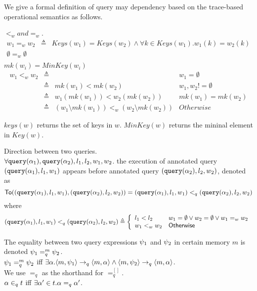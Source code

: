 \documentclass[a4paper,11pt]{article}
\begin{document}
{
   We give a formal definition of query may dependency based on the trace-based operational semantics as follows.
   }
%
\begin{defn}
$<_w and =_w$.\\
\[
  \begin{array}{lll}
     w_1 =_w w_2  &  \triangleq &  Keys(w_1) = Keys(w_2) \land \forall k \in Keys(w_1). w_1(k) = w_2(k) \\
     \emptyset =_w \emptyset & &   \\
  \end{array}
\] 
$mk(w_i) =MinKey(w_i) $ 
\[
\begin{array}{lllr}
     w_1 <_w w_2 & \triangleq & & w_1 = \emptyset \\
     & \triangleq  & mk(w_1) < mk(w_2) & w_1,w_2 != \emptyset  \\
     & \triangleq & w_1(mk(w_1)) < w_2(mk(w_2))   & mk(w_1) = mk(w_2) \\
     & \triangleq & (w_1 \setminus mk(w_1) ) <_w (w_2 \setminus mk(w_2)) & Otherwise
\end{array}
\]
\end{defn}
$keys(w)$ returns the set of keys in $w$. $MinKey(w)$ returns the mininal element in $Key(w)$.
%
\begin{defn}
\label{def:query_dir}
Direction between two queries.
\\
{
$\forall {\tt query}(\alpha_1), {\tt query}(\alpha_2), l_1, l_2, w_1, w_2 $.
the execution of annotated query $( {\tt query}(\alpha_1), l_1, w_1)$ appears before annotated query $( {\tt query}(\alpha_2), l_2, w_2)$, denoted as
%
\[
\mathsf{To}(({\tt query}(\alpha_1), l_1, w_1), ( {\tt query}(\alpha_2), l_2, w_2))
= 
({\tt query}(\alpha_1), l_1, w_1) 
<_q ( {\tt query}(\alpha_2), l_2, w_2)
\]
where \\
\[
(\query(\qval_1), l_1, w_1) 
<_q ( \query(\qval_2), l_2, w_2)
 \triangleq 
 \left\{
 \begin{array}{ll}
    l_1 < l_2  
    & w_1=\emptyset \lor w_2 = \emptyset \lor w_1 =_w w_2
    \\
    w_1 <_w w_2
    & \mathsf{Otherwise}
\end{array}  
\right.
\]
}
\end{defn}
% 
%
\begin{defn}
 The equality between two query expressions $\psi_1$ and $\psi_2$ in certain memory $m$ is denoted  $ \psi_1 =_{q}^{m} \psi_2$.\\
$\psi_1 =_{q}^{m} \psi_2$ iff $ \exists \alpha. \langle m,  \psi_1 \rangle \rightarrow_q \langle m, \alpha \rangle \land \langle m,  \psi_2  \rangle \rightarrow_q \langle m, \alpha \rangle $. \\
We use $=_{q}$ as the shorthand for $=_{q}^{[]}$.\\
$\alpha \in_q t $ iff $\exists \alpha' \in t. \alpha =_q \alpha'$.
\end{defn}
\end{document}
